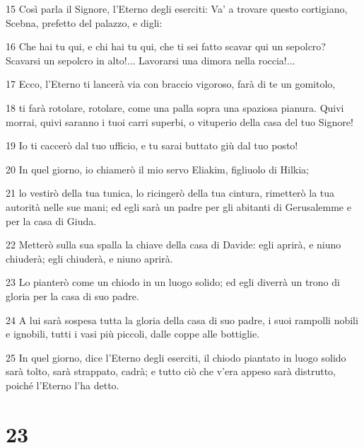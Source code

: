 \par 15 Così parla il Signore, l'Eterno degli eserciti: Va' a trovare questo cortigiano, Scebna, prefetto del palazzo, e digli:
\par 16 Che hai tu qui, e chi hai tu qui, che ti sei fatto scavar qui un sepolcro? Scavarsi un sepolcro in alto!... Lavorarsi una dimora nella roccia!...
\par 17 Ecco, l'Eterno ti lancerà via con braccio vigoroso, farà di te un gomitolo,
\par 18 ti farà rotolare, rotolare, come una palla sopra una spaziosa pianura. Quivi morrai, quivi saranno i tuoi carri superbi, o vituperio della casa del tuo Signore!
\par 19 Io ti caccerò dal tuo ufficio, e tu sarai buttato giù dal tuo posto!
\par 20 In quel giorno, io chiamerò il mio servo Eliakim, figliuolo di Hilkia;
\par 21 lo vestirò della tua tunica, lo ricingerò della tua cintura, rimetterò la tua autorità nelle sue mani; ed egli sarà un padre per gli abitanti di Gerusalemme e per la casa di Giuda.
\par 22 Metterò sulla sua spalla la chiave della casa di Davide: egli aprirà, e niuno chiuderà; egli chiuderà, e niuno aprirà.
\par 23 Lo pianterò come un chiodo in un luogo solido; ed egli diverrà un trono di gloria per la casa di suo padre.
\par 24 A lui sarà sospesa tutta la gloria della casa di suo padre, i suoi rampolli nobili e ignobili, tutti i vasi più piccoli, dalle coppe alle bottiglie.
\par 25 In quel giorno, dice l'Eterno degli eserciti, il chiodo piantato in luogo solido sarà tolto, sarà strappato, cadrà; e tutto ciò che v'era appeso sarà distrutto, poiché l'Eterno l'ha detto.

\chapter{23}

